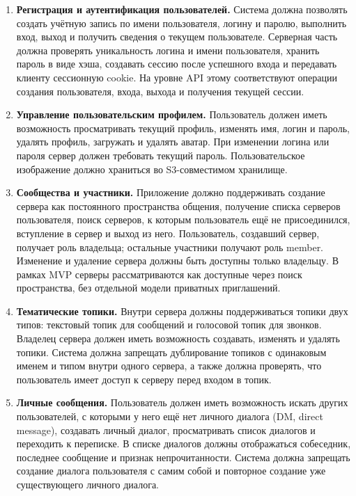 \documentclass[a4paper,12pt]{extarticle}
\begin{document}
\begin{enumerate}
    \item [F-1] \textbf{Регистрация и аутентификация пользователей.} Система должна позволять создать учётную запись по имени пользователя, логину и паролю, выполнить вход, выход и получить сведения о текущем пользователе. Серверная часть должна проверять уникальность логина и имени пользователя, хранить пароль в виде хэша, создавать сессию после успешного входа и передавать клиенту сессионную cookie. На уровне API этому соответствуют операции создания пользователя, входа, выхода и получения текущей сессии.

    \item [F-2] \textbf{Управление пользовательским профилем.} Пользователь должен иметь возможность просматривать текущий профиль, изменять имя, логин и пароль, удалять профиль, загружать и удалять аватар. При изменении логина или пароля сервер должен требовать текущий пароль. Пользовательское изображение должно храниться во S3-совместимом хранилище.

    \item [F-3] \textbf{Сообщества и участники.} Приложение должно поддерживать создание сервера как постоянного пространства общения, получение списка серверов пользователя, поиск серверов, к которым пользователь ещё не присоединился, вступление в сервер и выход из него. Пользователь, создавший сервер, получает роль владельца; остальные участники получают роль member. Изменение и удаление сервера должны быть доступны только владельцу. В рамках MVP серверы рассматриваются как доступные через поиск пространства, без отдельной модели приватных приглашений.

    \item [F-4] \textbf{Тематические топики.} Внутри сервера должны поддерживаться топики двух типов: текстовый топик для сообщений и голосовой топик для звонков. Владелец сервера должен иметь возможность создавать, изменять и удалять топики. Система должна запрещать дублирование топиков с одинаковым именем и типом внутри одного сервера, а также должна проверять, что пользователь имеет доступ к серверу перед входом в топик.

    \item [F-5] \textbf{Личные сообщения.} Пользователь должен иметь возможность искать других пользователей, с которыми у него ещё нет личного диалога (DM, direct message), создавать личный диалог, просматривать список диалогов и переходить к переписке. В списке диалогов должны отображаться собеседник, последнее сообщение и признак непрочитанности. Система должна запрещать создание диалога пользователя с самим собой и повторное создание уже существующего личного диалога.


\end{enumerate}
\end{document}
